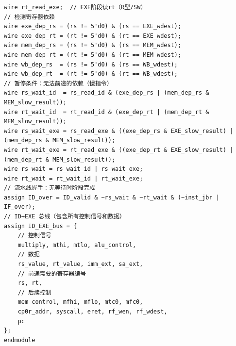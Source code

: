 ﻿\documentclass{article}
\begin{document}
\begin{verbatim}
wire rt_read_exe;  // EXE阶段读rt（R型/SW）
// 检测寄存器依赖
wire exe_dep_rs = (rs != 5'd0) & (rs == EXE_wdest);
wire exe_dep_rt = (rt != 5'd0) & (rt == EXE_wdest);
wire mem_dep_rs = (rs != 5'd0) & (rs == MEM_wdest);
wire mem_dep_rt = (rt != 5'd0) & (rt == MEM_wdest);
wire wb_dep_rs  = (rs != 5'd0) & (rs == WB_wdest);
wire wb_dep_rt  = (rt != 5'd0) & (rt == WB_wdest);
// 暂停条件：无法前递的依赖（慢指令）
wire rs_wait_id  = rs_read_id & (exe_dep_rs | (mem_dep_rs & MEM_slow_result));
wire rt_wait_id  = rt_read_id & (exe_dep_rt | (mem_dep_rt & MEM_slow_result));
wire rs_wait_exe = rs_read_exe & ((exe_dep_rs & EXE_slow_result) | (mem_dep_rs & MEM_slow_result));
wire rt_wait_exe = rt_read_exe & ((exe_dep_rt & EXE_slow_result) | (mem_dep_rt & MEM_slow_result));
wire rs_wait = rs_wait_id | rs_wait_exe;
wire rt_wait = rt_wait_id | rt_wait_exe;
// 流水线握手：无等待时阶段完成
assign ID_over = ID_valid & ~rs_wait & ~rt_wait & (~inst_jbr | IF_over);
// ID→EXE 总线（包含所有控制信号和数据）
assign ID_EXE_bus = {
    // 控制信号
    multiply, mthi, mtlo, alu_control,
    // 数据
    rs_value, rt_value, imm_ext, sa_ext,
    // 前递需要的寄存器编号
    rs, rt,
    // 后续控制
    mem_control, mfhi, mflo, mtc0, mfc0,
    cp0r_addr, syscall, eret, rf_wen, rf_wdest,
    pc
};
endmodule
\end{verbatim}
\end{document}
